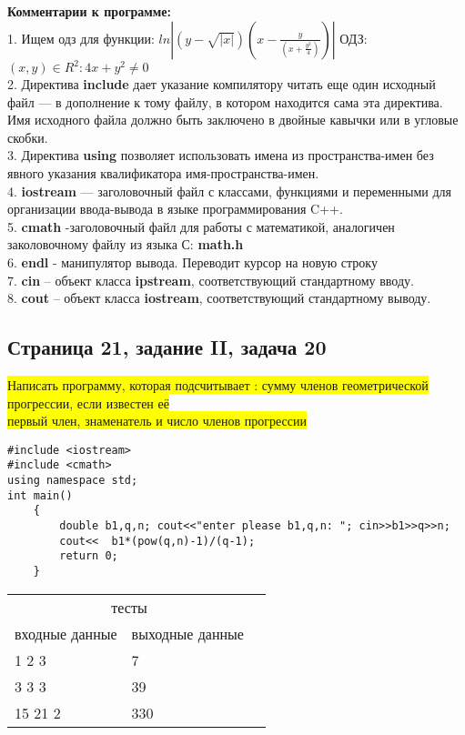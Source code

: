 \documentclass[11pt]{article}
\begin{document}
\begin{flushleft}
\textbf{Комментарии к программе:} \\
1. Ищем одз для функции:  $ln|(y-\sqrt{|x|})(x-\frac{y}{(x+\frac{y^2}{4})})|$
\newline ОДЗ: ${(x,y) \in R^2: 4x+y^2\ne 0}$\\
2. Директива \textbf{include} дает указание компилятору читать еще один исходный файл — в дополнение к тому файлу, в котором находится сама эта директива. Имя исходного файла должно быть заключено в двойные кавычки или в угловые скобки. \\
3. Директива \textbf{using} позволяет использовать имена из пространства-имен без явного указания квалификатора имя-пространства-имен.\\
4. \textbf{iostream} — заголовочный файл с классами, функциями и переменными для организации ввода-вывода в языке программирования C++. \\
5. \textbf{cmath} -заголовочный файл для работы с математикой, аналогичен заколовочному файлу из языка С: \textbf{math.h} \\
6. \textbf{endl} - манипулятор вывода. Переводит курсор на новую строку \\
7. \textbf{cin} – объект класса \textbf{ipstream}, соответствующий стандартному вводу. \\
8. \textbf{cout} – объект класса \textbf{iostream}, соответствующий стандартному выводу. \\

\newpage
\begin{center}
\section{Страница 21, задание II, задача 20}
\colorbox{yellow}{Написать программу, которая подсчитывает : сумму членов геометрической прогрессии, если известен её}\\\colorbox{yellow}{ первый член, знаменатель и число членов прогрессии }
\end{center}
\begin{lstlisting}
#include <iostream>
#include <cmath>
using namespace std;
int main()
	{
		double b1,q,n; cout<<"enter please b1,q,n: "; cin>>b1>>q>>n;
		cout<<	b1*(pow(q,n)-1)/(q-1);
		return 0;
	}
\end{lstlisting}

\begin{table}[h]\begin{center}\begin{tabular}{|l|l|l}
\cline{1-2}
\multicolumn{2}{|c|}{тесты} &  \\ \cline{1-2}
     входные данные      &       выходные данные    &  \\ \cline{1-2}
         1 2 3 &       7    &  \\ \cline{1-2}
         3 3 3 &       39    &  \\ \cline{1-2}
         15 21 2 &     330    &  \\ \cline{1-2}
\end{tabular}\end{center}\end{table}


\end{flushleft}
\end{document}
